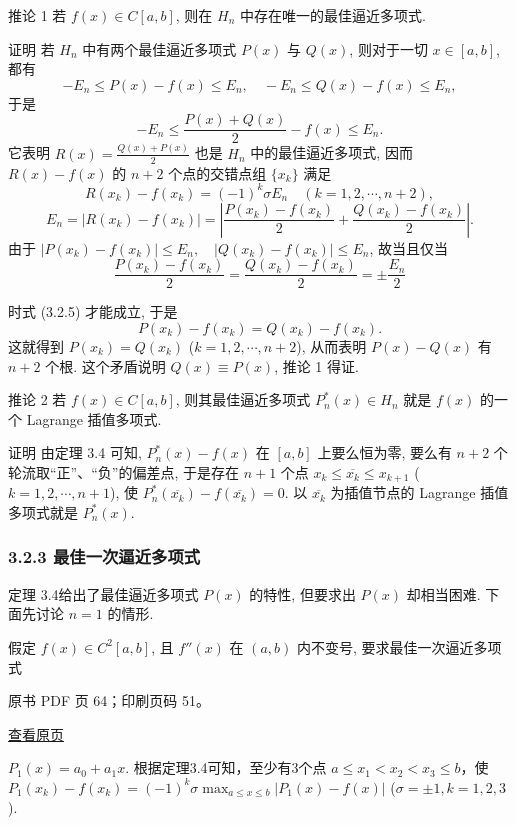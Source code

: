 推论 1 若 \(f(x) \in C[a,b]\), 则在 \(H_n\) 中存在唯一的最佳逼近多项式.

证明 若 \(H_n\) 中有两个最佳逼近多项式 \(P(x)\) 与 \(Q(x)\), 则对于一切 \(x \in [a,b]\), 都有 \[
-E_n \leqslant P(x)-f(x) \leqslant E_n, \quad -E_n \leqslant Q(x)-f(x) \leqslant E_n,
\] 于是 \[
-E_n \leqslant \frac{P(x)+Q(x)}{2}-f(x) \leqslant E_n.
\] 它表明 \(R(x)=\frac{Q(x)+P(x)}{2}\) 也是 \(H_n\) 中的最佳逼近多项式, 因而 \(R(x)-f(x)\) 的 \(n+2\) 个点的交错点组 \(\{x_k\}\) 满足 \[
R(x_k)-f(x_k)=(-1)^k \sigma E_n \quad (k=1,2,\cdots,n+2),
\] \[
E_n=\left|R(x_k)-f(x_k)\right|=\left|\frac{P(x_k)-f(x_k)}{2}+\frac{Q(x_k)-f(x_k)}{2}\right|. \tag{3.2.5}
\] 由于 \(\left|P(x_k)-f(x_k)\right| \leqslant E_n, \quad \left|Q(x_k)-f(x_k)\right| \leqslant E_n\), 故当且仅当 \[
\frac{P(x_k)-f(x_k)}{2}=\frac{Q(x_k)-f(x_k)}{2}=\pm \frac{E_n}{2}
\]

时式 (3.2.5) 才能成立, 于是 \[
P(x_k)-f(x_k)=Q(x_k)-f(x_k).
\] 这就得到 \(P(x_k)=Q(x_k)\) (\(k=1,2,\cdots,n+2\)), 从而表明 \(P(x)-Q(x)\) 有 \(n+2\) 个根. 这个矛盾说明 \(Q(x) \equiv P(x)\), 推论 1 得证.

推论 2 若 \(f(x) \in C[a,b]\), 则其最佳逼近多项式 \(P_n^*(x) \in H_n\) 就是 \(f(x)\) 的一个 Lagrange 插值多项式.

证明 由定理 3.4 可知, \(P_n^*(x)-f(x)\) 在 \([a,b]\) 上要么恒为零, 要么有 \(n+2\) 个轮流取``正''、``负''的偏差点, 于是存在 \(n+1\) 个点 \(x_k \leqslant \overline{x_k} \leqslant x_{k+1}\) (\(k=1,2,\cdots,n+1\)), 使 \(P_n^*(\overline{x_k})-f(\overline{x_k})=0\). 以 \(\overline{x_k}\) 为插值节点的 Lagrange 插值多项式就是 \(P_n^*(x)\).

\subsubsection{3.2.3 最佳一次逼近多项式}\label{ch03a-ux6700ux4f73ux4e00ux6b21ux903cux8fd1ux591aux9879ux5f0f}

定理 3.4给出了最佳逼近多项式 \(P(x)\) 的特性, 但要求出 \(P(x)\) 却相当困难. 下面先讨论 \(n=1\) 的情形.

假定 \(f(x) \in C^2[a,b]\), 且 \(f''(x)\) 在 \((a,b)\) 内不变号, 要求最佳一次逼近多项式

\clearpage

原书 PDF 页 64；印刷页码 51。

\href{source-images/pdf-064.jpeg}{查看原页}

\(P_1(x) = a_0 + a_1x\). 根据定理3.4可知，至少有3个点 \(a \leqslant x_1 < x_2 < x_3 \leqslant b\)，使 \(P_1(x_k) - f(x_k) = (-1)^k \sigma \max_{a \leqslant x \leqslant b} |P_1(x) - f(x)|\) (\(\sigma = \pm 1, k = 1, 2, 3\)).

